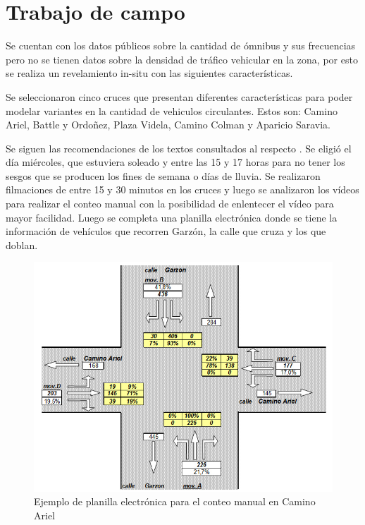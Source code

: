 \section{Trabajo de campo}
Se cuentan con los datos públicos sobre la cantidad de  ómnibus y sus frecuencias pero no se tienen datos sobre la densidad de tráfico vehicular en la zona, por esto se realiza un revelamiento in-situ con las siguientes características.

Se seleccionaron cinco cruces que presentan diferentes características para poder modelar variantes en la cantidad de vehiculos circulantes.
Estos son: Camino Ariel, Battle y Ordoñez, Plaza Videla, Camino Colman y Aparicio Saravia. 

Se siguen las recomendaciones de los textos consultados al respecto \citep{ConteoTrafico}. Se eligió el día miércoles, que estuviera soleado y entre las 15 y 17 horas para no tener los sesgos que se producen los fines de semana o días de lluvia.
Se realizaron filmaciones de entre 15 y 30 minutos en los cruces y luego se analizaron los vídeos para realizar el conteo manual con la posibilidad de enlentecer el vídeo para mayor facilidad. Luego se completa una planilla electrónica donde se tiene la información de vehículos que recorren Garzón, la calle que cruza y los que doblan. 

\begin{figure}[H]
	\centering
	\includegraphics[width=0.7\linewidth]{Figures/conteo_hoja}
	\caption{Ejemplo de planilla electrónica para el conteo manual en Camino Ariel}
	\label{fig:conteo_hoja}
\end{figure}



